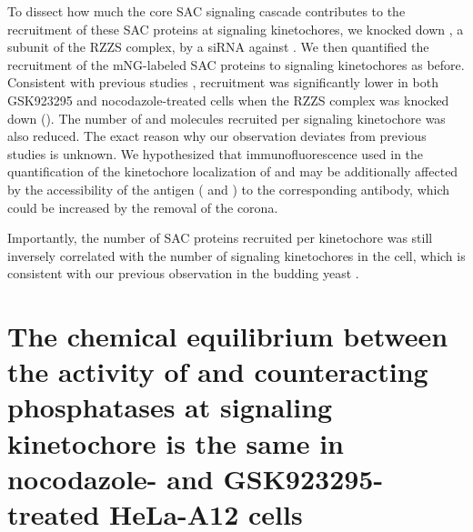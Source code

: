 To dissect how much the core SAC signaling cascade contributes to the recruitment of these SAC proteins at signaling kinetochores, we knocked down , a subunit of the RZZS complex, by a siRNA against . We then quantified the recruitment of the mNG-labeled SAC proteins to signaling kinetochores as before. Consistent with previous studies \cite{CENPELocalization-BUBR1,siROD_Zhang2019},  recruitment was significantly lower in both GSK923295 and nocodazole-treated cells when the RZZS complex was knocked down (). The number of  and  molecules recruited per signaling kinetochore was also reduced. The exact reason why our observation deviates from previous studies is unknown. We hypothesized that immunofluorescence used in the quantification of the kinetochore localization of  and  \cite{BUBR1_XenopusVSHeLa,siROD_Zhang2019} may be additionally affected by the accessibility of the antigen ( and ) to the corresponding antibody, which could be increased by the removal of the corona.

Importantly, the number of SAC proteins recruited per kinetochore was still inversely correlated with the number of signaling kinetochores in the cell, which is consistent with our previous observation in the budding yeast \cite{Aravamudhan2016}.

\section{The chemical equilibrium between the activity of  and counteracting phosphatases at signaling kinetochore is the same in nocodazole- and GSK923295-treated HeLa-A12 cells}

